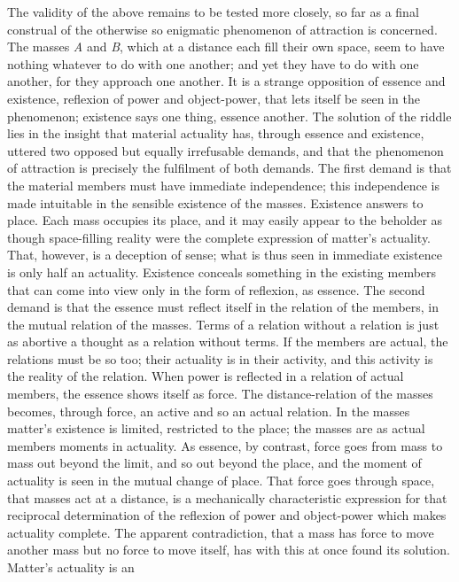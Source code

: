 \documentclass[12pt,a4paper]{book}
\begin{document}
The validity of the above remains to be tested more closely, so far as a final
construal of the otherwise so enigmatic phenomenon of attraction is concerned. The
masses \textit{A} and \textit{B}, which at a distance each fill their own space,
seem to have nothing whatever to do with one another; and yet they have to do with
one another, for they approach one another. It is a
strange opposition of essence and existence, reflexion of power and object-power,
that lets itself be seen in the phenomenon; existence says one thing, essence
another. The solution of the riddle lies in the insight that material actuality has,
through essence and existence, uttered two opposed but equally irrefusable demands,
and that the phenomenon of attraction is precisely the fulfilment of both demands.
The first demand is that the material members must have immediate independence;
this independence is made intuitable in the sensible existence of the masses.
Existence answers to place. Each mass occupies its place, and it may easily appear
to the beholder as though space-filling reality were the complete expression of
matter's actuality. That, however, is a deception of sense; what is thus seen in
immediate existence is only half an actuality. Existence conceals something in the
existing members that can come into view only in the form of reflexion, as essence.
The second demand is that the essence must reflect itself in the relation of the
members, in the mutual relation of the masses. Terms of a relation without a
relation is just as abortive a thought as a relation without terms. If the members
are actual, the relations must be so too; their actuality is in their activity, and
this activity is the reality of the relation. When power is reflected in a relation
of actual members, the essence shows itself as force. The distance-relation of the
masses becomes, through force, an active and so an actual relation. In the masses
matter's existence is limited, restricted to the place; the masses are as actual
members moments in actuality. As essence, by contrast, force goes from mass to mass
out beyond the limit, and so out beyond the place, and the moment of actuality is
seen in the mutual change of place. That force goes through space, that masses act
at a distance, is a mechanically characteristic expression for that reciprocal
determination of the reflexion of power and object-power which makes actuality
complete.
The apparent contradiction, that a mass has force to move another mass but no force
to move itself, has with this at once found its solution. Matter's actuality is an
\end{document}
